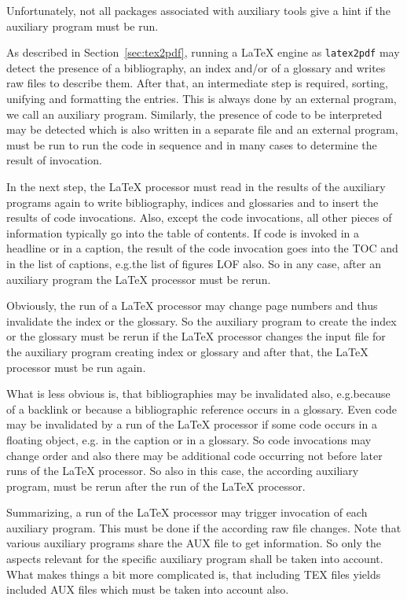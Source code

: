 Unfortunately, not all packages associated with auxiliary tools 
give a hint if the auxiliary program must be run. 
\medskip


As described in Section~\ref{sec:tex2pdf}, 
running a \LaTeX{} engine as \texttt{latex2pdf} 
may detect the presence of a bibliography, an index and/or of a glossary 
and writes raw files to describe them. 
After that, an intermediate step is required, 
sorting, unifying and formatting the entries. 
This is always done by an external program, we call an auxiliary program. 
Similarly, the presence of code to be interpreted 
may be detected which is also written in a separate file 
and an external program, 
 must be run to run the code in sequence 
and in many cases to determine the result of invocation. 

In the next step, 
the \LaTeX{} processor must read in the results of the auxiliary programs again 
to write bibliography, indices and glossaries 
and to insert the results of code invocations. 
Also, except the code invocations, 
all other pieces of information typically go into the table of contents. 
If code is invoked in a headline or in a caption, 
the result of the code invocation goes into the TOC and in the list of captions, 
e.g.\@ the list of figures LOF also. 
So in any case, after an auxiliary program the \LaTeX{} processor must be rerun. 

Obviously, the run of a \LaTeX{} processor may change page numbers 
and thus invalidate the index or the glossary. 
So the auxiliary program to create the index or the glossary must be rerun 
if the \LaTeX{} processor changes the input file for the auxiliary program 
creating index or glossary and after that, 
the \LaTeX{} processor must be run again. 

What is less obvious is, that bibliographies may be invalidated also, 
e.g.\@ because of a backlink 
or because a bibliographic reference occurs in a glossary. 
Even code may be invalidated by a run of the \LaTeX{} processor 
if some code occurs in a floating object, e.g. in the caption or in a glossary. 
So code invocations may change order 
and also there may be additional code 
occurring not before later runs of the \LaTeX{} processor. 
So also in this case, the according auxiliary program,  
must be rerun after the run of the \LaTeX{} processor. 

Summarizing, a run of the \LaTeX{} processor 
may trigger invocation of each auxiliary program. 
This must be done if the according raw file changes. 
Note that various auxiliary programs share the AUX file to get information. 
So only the aspects relevant for the specific auxiliary program 
shall be taken into account. 
What makes things a bit more complicated is, 
that including TEX files yields included AUX files 
which must be taken into account also. 

